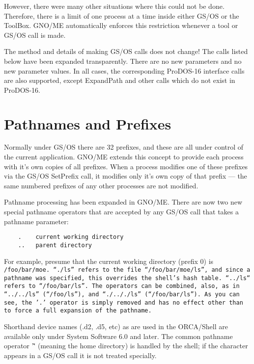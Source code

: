 \documentclass{report}
\begin{document}
However, there were many other situations
where this could not be done. Therefore, there is a limit of one
process at a time inside either GS/OS or the ToolBox. GNO/ME
automatically enforces this restriction whenever a tool or GS/OS
call is made.

The method and details of making GS/OS
calls does not change! The calls listed below have been expanded
transparently. There are no new parameters and no new parameter
values. In all cases, the corresponding ProDOS-16 interface calls
are also supported, except ExpandPath and other calls which do
not exist in ProDOS-16.

\section{Pathnames and Prefixes}

Normally under GS/OS there are 32 prefixes,
and these are all under control of the current application.
GNO/ME extends this concept to provide each process with it's own
copies of all prefixes. When a process modifies one of these
prefixes via the GS/OS SetPrefix call, it modifies only it's own
copy of that prefix --- the same numbered prefixes of any other
processes are not modified. 

Pathname processing has been expanded in
GNO/ME. There are now two new special pathname operators that are
accepted by any GS/OS call that takes a pathname parameter:

\begin{verbatim}
    .    current working directory
    ..   parent directory
\end{verbatim}

For example, presume that the current
working directory (prefix 0) is \tt /foo/bar/moe\rm.
``\tt./ls\rm'' refers to the file ``\tt/foo/bar/moe/ls\rm'',
and since a pathname was specified, this overrides the shell's hash table. 
``\tt../ls\rm`` refers to ``\tt/foo/bar/ls\rm''.
The operators can be combined, also, as in
``\tt../../ls\rm'' (``\tt/foo/ls\rm''), and
``\tt./.././ls\rm'' (``\tt/foo/bar/ls\rm'').
As you can see, the '.' operator is simply
removed and has no effect other than to force a full expansion of
the pathname.

Shorthand 
device names (.d2, .d5, etc) as are used in the ORCA/Shell
are available only under System Software 6.0 and later.
The common pathname operator '\~' (meaning the home
directory) is handled by the shell; if the character appears in a
GS/OS call it is not treated specially.
\end{document}
